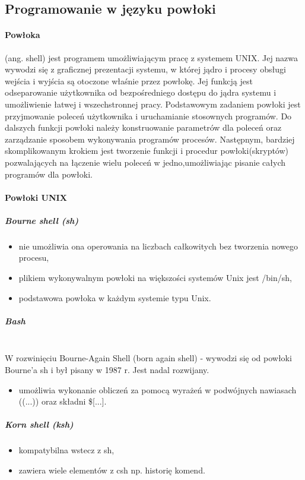 \documentclass[a4paper,twoside]{report}
\begin{document}
\subsection{Programowanie w języku powłoki}

\paragraph{Powłoka} (ang. shell) jest programem umożliwiającym pracę z systemem   UNIX. Jej nazwa wywodzi się z graficznej prezentacji systemu, w której jądro i procesy obsługi wejścia i wyjścia są otoczone właśnie przez powłokę. Jej funkcją jest odseparowanie użytkownika od bezpośredniego dostępu do jądra systemu i umożliwienie   łatwej i wszechstronnej pracy. Podstawowym zadaniem powłoki jest przyjmowanie     poleceń użytkownika i uruchamianie stosownych programów. Do dalszych funkcji powłoki należy konstruowanie parametrów dla poleceń oraz zarządzanie sposobem wykonywania programów procesów. Następnym, bardziej skomplikowanym krokiem jest tworzenie   funkcji i procedur powłoki(skryptów) pozwalających   na łączenie wielu   poleceń  w   jedno,umożliwiając pisanie całych programów dla powłoki.
\paragraph{Powłoki UNIX}

\subparagraph{Bourne shell (sh)}

\begin{itemize}
	\item nie umożliwia ona operowania na liczbach całkowitych bez tworzenia nowego procesu,
	\item plikiem wykonywalnym powłoki na większości systemów Unix jest /bin/sh,
	\item  podstawowa powłoka w każdym systemie typu Unix.
\end{itemize}

\subparagraph{Bash\\\\}
W rozwinięciu Bourne-Again Shell (born again shell) - wywodzi się od powłoki Bourne'a sh i był pisany w 1987 r. Jest nadal rozwijany.
\begin{itemize}
	\item umożliwia wykonanie obliczeń za pomocą wyrażeń w podwójnych nawiasach ((...)) oraz składni \$[...].
\end{itemize}

\subparagraph{Korn shell (ksh)}
\begin{itemize}
	\item kompatybilna wstecz z sh,
	\item zawiera wiele elementów z csh np. historię komend.
\end{itemize}
\end{document}
